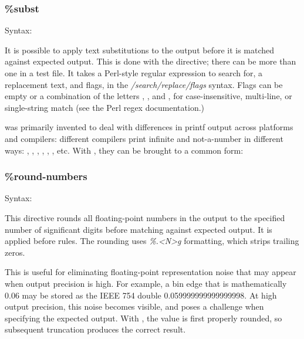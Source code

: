 \subsubsection{\%subst}
\label{sec:testing:opptest:subst}

Syntax:

\begin{filelisting}
\end{filelisting}

It is possible to apply text substitutions to the output before it is
matched against expected output. This is done with the 
directive; there can be more than one  in a test file. It
takes a Perl-style regular expression to search for, a replacement text,
and flags, in the \textit{/search/replace/flags} syntax. Flags can be empty
or a combination of the letters , , and , for
case-insensitive, multi-line, or single-string match (see the Perl regex
documentation.)

 was primarily invented to deal with differences in printf
output across platforms and compilers: different compilers print infinite
and not-a-number in different ways: , , ,
, , , etc. With , they can be
brought to a common form:

\begin{filelisting}
\end{filelisting}

\subsubsection{\%round-numbers}
\label{sec:testing:opptest:round-numbers}

Syntax:

\begin{filelisting}
\end{filelisting}

This directive rounds all floating-point numbers in the output to the
specified number of significant digits before matching against expected
output. It is applied before  rules. The rounding uses
\textit{\%.<N>g} formatting, which strips trailing zeros.

This is useful for eliminating floating-point representation noise that
may appear when output precision is high. For example, a bin edge that is
mathematically 0.06 may be stored as the IEEE 754 double
0.059999999999999998. At high output precision, this noise becomes visible,
and poses a challenge when specifying the expected output.
With , the value is first properly
rounded, so subsequent truncation produces the correct result.

